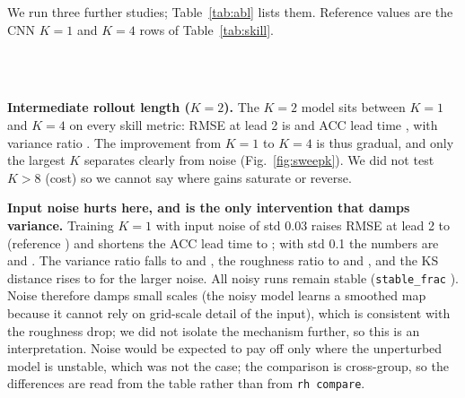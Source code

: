 We run three further studies; Table~\ref{tab:abl} lists them. Reference values are the CNN $K{=}1$ and $K{=}4$ rows of Table~\ref{tab:skill}.

\begin{table}[t]\centering
\caption{Sensitivity and ablation groups (mean $\pm$ std over 5 seeds). Top: rollout length $K{=}2$ (\texttt{sweep\_K}). Middle: $K{=}1$ with Gaussian input noise of std $0.03$ and $0.1$ (\texttt{abl\_noise}). Bottom: $K{=}1,4$ trained on only $4$ of the $32$ training trajectories (\texttt{sweep\_ntrain}). In each block the bold/underline ranking is only among that block's rows; the reference $K{=}1,4,8$ rows are in Tables~\ref{tab:skill} and~\ref{tab:clim}.}\label{tab:abl}
\small
\\[2pt]
\\[2pt]

\end{table}

\textbf{Intermediate rollout length ($K{=}2$).} The $K{=}2$ model sits between $K{=}1$ and $K{=}4$ on every skill metric: RMSE at lead 2 is  and ACC lead time , with variance ratio . The improvement from $K{=}1$ to $K{=}4$ is thus gradual, and only the largest $K$ separates clearly from noise (Fig.~\ref{fig:sweepk}). We did not test $K>8$ (cost) so we cannot say where gains saturate or reverse.

\textbf{Input noise hurts here, and is the only intervention that damps variance.} Training $K{=}1$ with input noise of std 0.03 raises RMSE at lead 2 to  (reference ) and shortens the ACC lead time to ; with std 0.1 the numbers are  and . The variance ratio falls to  and , the roughness ratio to  and , and the KS distance rises to  for the larger noise. All noisy runs remain stable (\texttt{stable\_frac} ). Noise therefore damps small scales (the noisy model learns a smoothed map because it cannot rely on grid-scale detail of the input), which is consistent with the roughness drop; we did not isolate the mechanism further, so this is an interpretation. Noise would be expected to pay off only where the unperturbed model is unstable, which was not the case; the comparison is cross-group, so the differences are read from the table rather than from \texttt{rh compare}.

